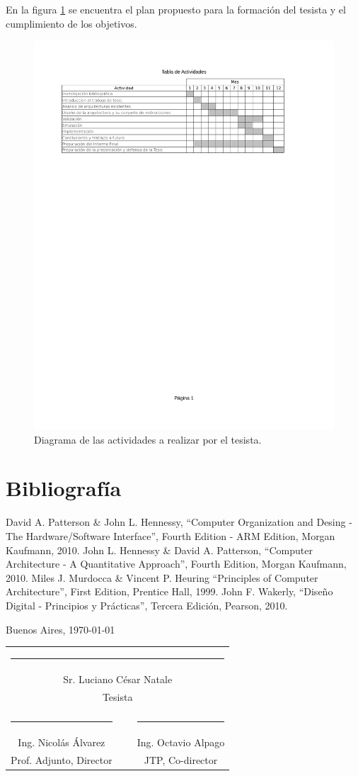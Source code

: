 \documentclass[a4paper]{article}
\newcommand{\signature}[7]{
	\vfill

	\begin{flushright}
		#1, \today
	\end{flushright}
	\vspace{3cm}

	\noindent
	\centering
	\begin{tabularx}{0.9\textwidth}{cXc}
		\multicolumn{3}{c}{\rule{5cm}{1pt}}\\
		\multicolumn{3}{c}{#2}\\
		\multicolumn{3}{c}{#3}\\
		\vspace{3cm}\\
		\rule{5cm}{1pt} & \hspace{2.5cm} & \rule{5cm}{1pt} \\
		#4 & ~ & #5 \\
		#6 & ~ & #7
	\end{tabularx}
	\vspace{1cm}
}
\begin{document}
En la figura \ref{fig:tabla_actividades} se encuentra el plan propuesto para la formación del tesista y el cumplimiento de los objetivos.

\begin{figure}[h!]
  \begin{center}
    \includegraphics[trim = 20mm 180mm 20mm 25mm, clip, width=\textwidth]{tabla_actividades}
  \end{center}
  \caption{Diagrama de las actividades a realizar por el tesista.}
  \label{fig:tabla_actividades}
\end{figure}
	
\newpage

\section{Bibliografía}

\begin{thebibliography}{99}

 David A. Patterson \& John L. Hennessy, ``Computer Organization and Desing - The Hardware/Software Interface'', Fourth Edition - ARM Edition, Morgan Kaufmann, 2010.
 John L. Hennessy \& David A. Patterson, ``Computer Architecture - A Quantitative Approach'', Fourth Edition, Morgan Kaufmann, 2010.
 Miles J. Murdocca \& Vincent P. Heuring ``Principles of Computer Architecture'', First Edition, Prentice Hall, 1999.
 John F. Wakerly, ``Diseño Digital - Principios y Prácticas'', Tercera Edición, Pearson, 2010.
\end{thebibliography}

\newpage

\signature{Buenos Aires}{Sr. Luciano César Natale}{Tesista}{Ing. Nicolás Álvarez}{Ing. Octavio Alpago}{Prof. Adjunto, Director}{JTP, Co-director}
\end{document}
